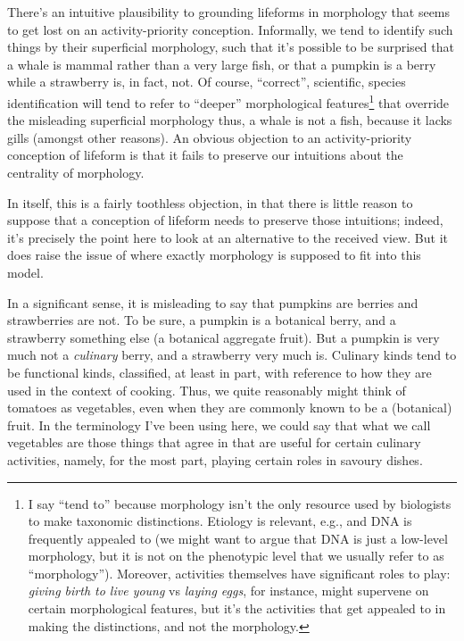 \documentclass{article}
\newcommand{\dash}{\unskip{—}}
\begin{document}
There's an intuitive plausibility to grounding lifeforms in morphology that seems to get lost on an activity-priority conception. Informally, we tend to identify such things by their superficial morphology, such that it's possible to be surprised that a whale is mammal rather than a very large fish, or that a pumpkin is a berry while a strawberry is, in fact, not. Of course, \enquote{correct}, scientific, species identification will tend to refer to \enquote{deeper} morphological features\footnote{I say \enquote{tend to} because morphology isn't the only resource used by biologists to make taxonomic distinctions. Etiology is relevant, e.g., and DNA is frequently appealed to (we might want to argue that DNA is just a low-level morphology, but it is not on the phenotypic level that we usually refer to as \enquote{morphology}). Moreover, activities themselves have significant roles to play: \emph{giving birth to live young} vs \emph{laying eggs}, for instance, might supervene on certain morphological features, but it's the activities that get appealed to in making the distinctions, and not the morphology.} that override the misleading superficial morphology \dash thus, a whale is not a fish, because it lacks gills (amongst other reasons). An obvious objection to an activity-priority conception of lifeform is that it fails to preserve our intuitions about the centrality of morphology.

In itself, this is a fairly toothless objection, in that there is little reason to suppose that a conception of lifeform needs to preserve those intuitions; indeed, it's precisely the point here to look at an alternative to the received view. But it does raise the issue of where exactly morphology is supposed to fit into this model.

In a significant sense, it is misleading to say that pumpkins are berries and strawberries are not. To be sure, a pumpkin is a botanical berry, and a strawberry something else (a botanical aggregate fruit). But a pumpkin is very much not a \emph{culinary} berry, and a strawberry very much is. Culinary kinds tend to be functional kinds, classified, at least in part, with reference to how they are used in the context of cooking. Thus, we quite reasonably might think of tomatoes  as vegetables, even when they are commonly known to be a (botanical) fruit. In the terminology I've been using here, we could say that what we call vegetables are those things that agree in \dash that are useful for \dash certain culinary activities, namely, for the most part, playing certain roles in savoury dishes.
\end{document}
